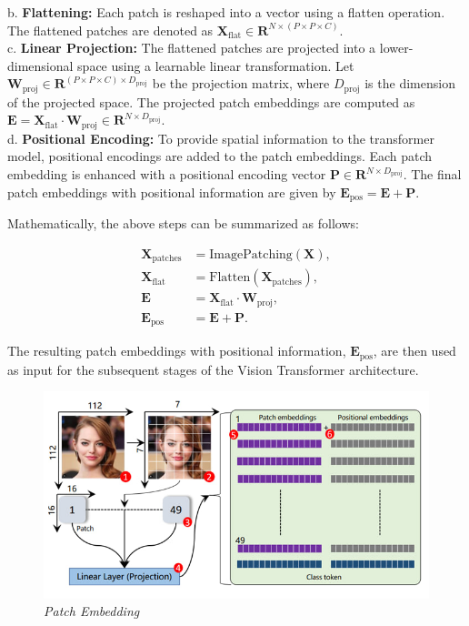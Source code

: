 \noindent b. \textbf{Flattening:} Each patch is reshaped into a vector using a flatten operation. The flattened patches are denoted as $\mathbf{X}_\text{flat} \in \mathbf{R}^{N \times (P \times P \times C)}$.
\\

\noindent c. \textbf{Linear Projection:} The flattened patches are projected into a lower-dimensional space using a learnable linear transformation. Let $\mathbf{W}_\text{proj} \in \mathbf{R}^{(P \times P \times C) \times D_\text{proj}}$ be the projection matrix, where $D_\text{proj}$ is the dimension of the projected space. The projected patch embeddings are computed as $\mathbf{E} = \mathbf{X}_\text{flat} \cdot \mathbf{W}_\text{proj} \in \mathbf{R}^{N \times D_\text{proj}}$.
\\

\noindent d. \textbf{Positional Encoding:} To provide spatial information to the transformer model, positional encodings are added to the patch embeddings. Each patch embedding is enhanced with a positional encoding vector $\mathbf{P} \in \mathbf{R}^{N \times D_\text{proj}}$. The final patch embeddings with positional information are given by $\mathbf{E}_\text{pos} = \mathbf{E} + \mathbf{P}$.

\noindent Mathematically, the above steps can be summarized as follows:

\begin{align}
    \mathbf{X}_\text{patches} & = \text{ImagePatching}(\mathbf{X}),                    \\
    \mathbf{X}_\text{flat}    & = \text{Flatten}(\mathbf{X}_\text{patches}),           \\
    \mathbf{E}                & = \mathbf{X}_\text{flat} \cdot \mathbf{W}_\text{proj}, \\
    \mathbf{E}_\text{pos}     & = \mathbf{E} + \mathbf{P}.
\end{align}

The resulting patch embeddings with positional information, $\mathbf{E}_\text{pos}$, are then used as input for the subsequent stages of the Vision Transformer architecture.


\begin{figure}[htbp]
    \centering
    \includegraphics[width=6in]{img/patchembedding.jpg}
    \caption{\textit{Patch Embedding}}
\end{figure}

